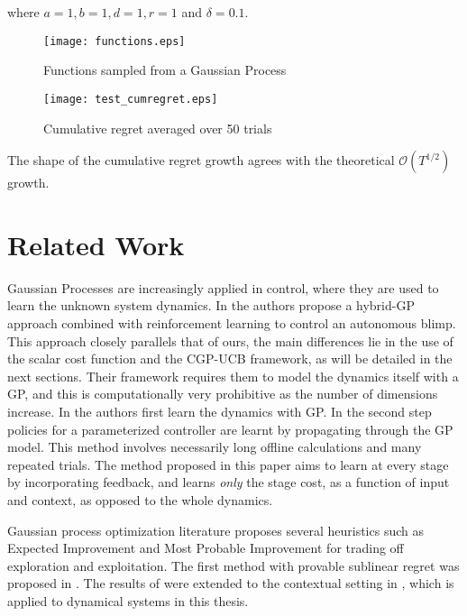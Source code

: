 where $a = 1, b = 1, d = 1, r = 1$ and $\delta = 0.1$. 

\begin{figure}[h!t]
\center
\texttt{[image: functions.eps]}			
\caption{Functions sampled from a Gaussian Process}
\label{fig:func}
\end{figure}

\begin{figure}[h!t]
\center
\texttt{[image: test\_cumregret.eps]}			
\caption{Cumulative regret averaged over 50 trials}
\label{fig:cumregret}
\end{figure}

The shape of the cumulative regret growth agrees with the theoretical $\mathcal{O}(T^{1/2})$ growth. 

\section{Related Work}

Gaussian Processes are increasingly applied in control, where they are used to learn the unknown system dynamics. In \cite{Blimp} the authors propose a hybrid-GP approach combined with reinforcement learning to control an autonomous blimp. 
This approach closely parallels that of ours, the main differences lie in the use of the scalar cost function and the CGP-UCB framework, as will be detailed in the next sections. Their framework requires them to model the dynamics itself with a GP, and this is computationally very prohibitive as the number of dimensions increase. In \cite{PILCO,Deisenroth} the authors first learn the dynamics with GP. In the second step policies for a parameterized controller are learnt by propagating through the GP model. This method involves necessarily long offline calculations and many repeated trials. The method proposed in this paper aims to learn at every stage by incorporating feedback, and learns \emph{only} the stage cost, as a function of input and context, as opposed to the whole dynamics.

Gaussian process optimization literature proposes several heuristics such as Expected Improvement \cite{Jones01ataxonomy} and Most Probable Improvement \cite{Lizotte07automaticgait} for trading off exploration and exploitation. The first method with provable sublinear regret was proposed in \cite{Krause1}. The results of \cite{Krause1} were extended to the contextual setting in \cite{Krause2}, which is applied to dynamical systems in this thesis.
